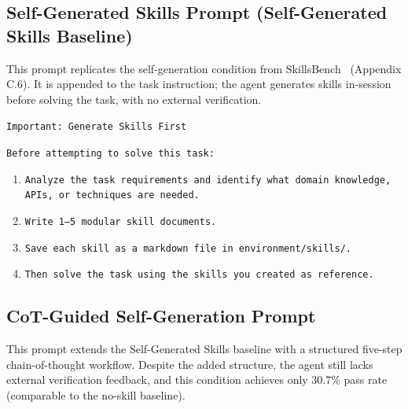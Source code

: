 \documentclass{article}
\newcommand{\bench}{SkillsBench\xspace}
\begin{document}
\subsection{Self-Generated Skills Prompt (Self-Generated Skills Baseline)}
\label{app:prompt_selfgen}

This prompt replicates the self-generation condition from \bench~\citep{li2026skillsbench} (Appendix C.6). It is appended to the task instruction; the agent generates skills in-session before solving the task, with no external verification.

\begin{tcolorbox}[colback=takeawayback, colframe=takeawayframe, title=\textbf{Self-Generated Skills Prompt}, fonttitle=\small, fontupper=\small]
\texttt{Important: Generate Skills First}

\texttt{Before attempting to solve this task:}
\begin{enumerate}
\item \texttt{Analyze the task requirements and identify what domain knowledge, APIs, or techniques are needed.}
\item \texttt{Write 1--5 modular skill documents.}
\item \texttt{Save each skill as a markdown file in environment/skills/.}
\item \texttt{Then solve the task using the skills you created as reference.}
\end{enumerate}
\end{tcolorbox}

\subsection{CoT-Guided Self-Generation Prompt}
\label{app:prompt_cot}

This prompt extends the Self-Generated Skills baseline with a structured five-step chain-of-thought workflow. Despite the added structure, the agent still lacks external verification feedback, and this condition achieves only 30.7\% pass rate (comparable to the no-skill baseline).
\end{document}
